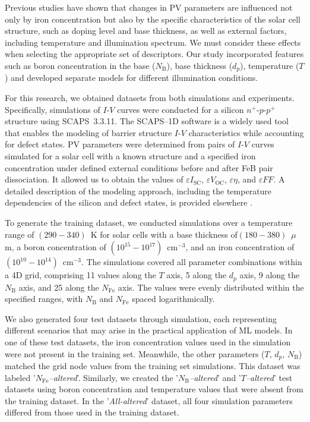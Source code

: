 \documentclass[a4paper,fleqn]{cas-sc}
\begin{document}
Previous studies \cite{FeB:Schmidt, OUR WORK} have shown that changes in PV parameters are influenced not only by iron concentration but also by the specific characteristics of the solar cell structure, such as doping level and base thickness, as well as external factors, including temperature and illumination spectrum. 
We must consider these effects when selecting the appropriate set of descriptors. 
Our study incorporated features such as boron concentration in the base ($N_\mathrm{B}$), base thickness ($d_p$), temperature ($T$) and developed separate models for different illumination conditions.


For this research, we obtained datasets from both simulations and experiments. 
Specifically, simulations of $I$-$V$ curves were conducted for a silicon $n^+$-$p$-$p^+$ structure using SCAPS~3.3.11. 
The SCAPS--1D software \cite{SCAPS1} is a widely used tool \cite{MasumMia2025, Joshi2024, Ravidas2024, Liu2024, You2023, SCAPSDefect3} that enables the modeling of barrier structure $I$-$V$ characteristics while accounting for defect states. 
PV parameters were determined from pairs of $I$-$V$ curves simulated for a solar cell with a known structure and a specified iron concentration under defined external conditions before and after FeB pair dissociation. 
It allowed us to obtain the values of $\varepsilon I_\mathrm{SC}$, $\varepsilon V_\mathrm{OC}$, $\varepsilon \eta$, and $\varepsilon F\!F$. 
A detailed description of the modeling approach, including the temperature dependencies of the silicon and defect states, is provided elsewhere \cite{Olikh2019SM, OUR WORK}.


To generate the training dataset, we conducted simulations over a temperature range of $(290-340)$~K for solar cells with a base thickness of$(180-380)$~$\mu$m, a boron concentration of $(10^{15} - 10^{17})$~cm$^{-3}$, and an iron concentration of $(10^{10} - 10^{14})$~cm$^{-3}$. 
The simulations covered all parameter combinations within a 4D grid, comprising 11 values along the $T$ axis, 5 along the $d_p$ axis, 9 along the $N_\mathrm{B}$ axis, and 25 along the $N_\mathrm{Fe}$ axis. 
The values were evenly distributed within the specified ranges, with $N_\mathrm{B}$ and $N_\mathrm{Fe}$ spaced logarithmically.


We also generated four test datasets through simulation, each representing different scenarios that may arise in the practical application of ML models. 
In one of these test datasets, the iron concentration values used in the simulation were not present in the training set. 
Meanwhile, the other parameters ($T$, $d_p$, $N_\mathrm{B}$) matched the grid node values from the training set simulations. 
This dataset was labeled '\textit{$N_\mathrm{Fe}$--altered}'. 
Similarly, we created the '\textit{$N_\mathrm{B}$--altered}' and '\textit{$T$--altered}' test datasets using boron concentration and temperature values that were absent from the training dataset. 
In the '\textit{All-altered}' dataset, all four simulation parameters differed from those used in the training dataset.
\end{document}

